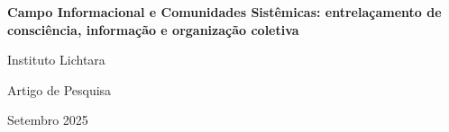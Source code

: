 \documentclass[12pt,a4paper]{article}
\begin{document}
\begin{titlepage}
    \centering
    \vspace*{2cm}
    
    {\huge\bfseries Campo Informacional e Comunidades Sistêmicas: entrelaçamento de consciência, informação e organização coletiva\par}
    
    \vspace{2cm}
    
    {\Large Instituto Lichtara\par}
    
    \vspace{1.5cm}
    
    {\large Artigo de Pesquisa\par}
    
    \vfill
    
    {\large Setembro 2025\par}
\end{titlepage}

\tableofcontents
\newpage











\end{document}
